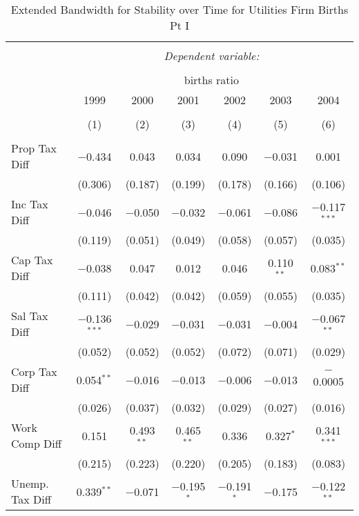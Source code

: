 
\begin{table}[!htbp] \centering 
  \caption{Extended Bandwidth for Stability over Time for  Utilities Firm Births Pt I} 
  \label{22year_eb} 
\small 
\begin{tabular}{@{\extracolsep{5pt}}lcccccc} 
\\[-1.8ex]\hline 
\hline \\[-1.8ex] 
 & \multicolumn{6}{c}{\textit{Dependent variable:}} \\ 
\cline{2-7} 
\\[-1.8ex] & \multicolumn{6}{c}{births ratio} \\ 
 & 1999 & 2000 & 2001 & 2002 & 2003 & 2004 \\ 
\\[-1.8ex] & (1) & (2) & (3) & (4) & (5) & (6)\\ 
\hline \\[-1.8ex] 
 Prop Tax Diff & $-$0.434 & 0.043 & 0.034 & 0.090 & $-$0.031 & 0.001 \\ 
  & (0.306) & (0.187) & (0.199) & (0.178) & (0.166) & (0.106) \\ 
  Inc Tax Diff & $-$0.046 & $-$0.050 & $-$0.032 & $-$0.061 & $-$0.086 & $-$0.117$^{***}$ \\ 
  & (0.119) & (0.051) & (0.049) & (0.058) & (0.057) & (0.035) \\ 
  Cap Tax Diff & $-$0.038 & 0.047 & 0.012 & 0.046 & 0.110$^{**}$ & 0.083$^{**}$ \\ 
  & (0.111) & (0.042) & (0.042) & (0.059) & (0.055) & (0.035) \\ 
  Sal Tax Diff & $-$0.136$^{***}$ & $-$0.029 & $-$0.031 & $-$0.031 & $-$0.004 & $-$0.067$^{**}$ \\ 
  & (0.052) & (0.052) & (0.052) & (0.072) & (0.071) & (0.029) \\ 
  Corp Tax Diff & 0.054$^{**}$ & $-$0.016 & $-$0.013 & $-$0.006 & $-$0.013 & $-$0.0005 \\ 
  & (0.026) & (0.037) & (0.032) & (0.029) & (0.027) & (0.016) \\ 
  Work Comp Diff & 0.151 & 0.493$^{**}$ & 0.465$^{**}$ & 0.336 & 0.327$^{*}$ & 0.341$^{***}$ \\ 
  & (0.215) & (0.223) & (0.220) & (0.205) & (0.183) & (0.083) \\ 
  Unemp. Tax Diff & 0.339$^{**}$ & $-$0.071 & $-$0.195$^{*}$ & $-$0.191$^{*}$ & $-$0.175 & $-$0.122$^{**}$ \\ 

\end{tabular}
\end{table}

